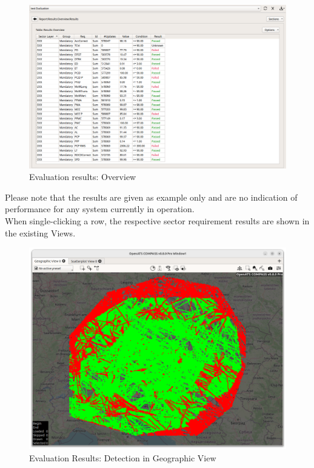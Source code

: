 \begin{figure}[H]
  \hspace*{-2cm}
    \includegraphics[width=18cm,frame]{figures/eval_report_overview.png}
  \caption{Evaluation results: Overview}
\end{figure}

Please note that the results are given as example only and are no indication of performance for any system currently in operation. \\

When single-clicking a row, the respective sector requirement results are shown in the existing Views.

\begin{figure}[H]
  \hspace*{-2.5cm}
    \includegraphics[width=19cm]{figures/geo_eval_detection.png}
  \caption{Evaluation Results: Detection in Geographic View}
\end{figure}


